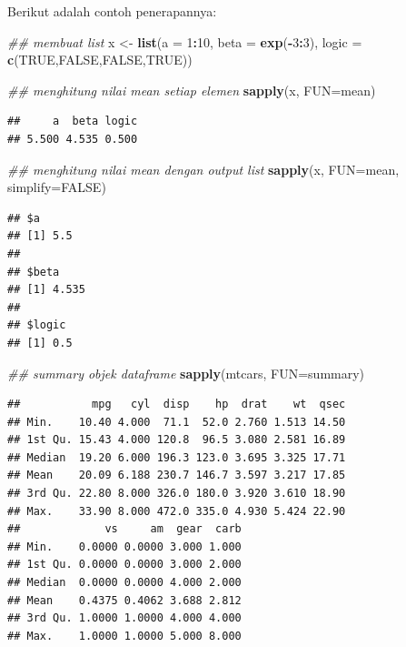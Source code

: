\documentclass[]{book}
\newenvironment{Shaded}{\begin{snugshade}}{\end{snugshade}}
\newcommand{\CommentTok}[1]{\textcolor[rgb]{0.56,0.35,0.01}{\textit{#1}}}
\newcommand{\DataTypeTok}[1]{\textcolor[rgb]{0.13,0.29,0.53}{#1}}
\newcommand{\DecValTok}[1]{\textcolor[rgb]{0.00,0.00,0.81}{#1}}
\newcommand{\KeywordTok}[1]{\textcolor[rgb]{0.13,0.29,0.53}{\textbf{#1}}}
\newcommand{\NormalTok}[1]{#1}
\newcommand{\OperatorTok}[1]{\textcolor[rgb]{0.81,0.36,0.00}{\textbf{#1}}}
\newcommand{\OtherTok}[1]{\textcolor[rgb]{0.56,0.35,0.01}{#1}}
\newcommand{\StringTok}[1]{\textcolor[rgb]{0.31,0.60,0.02}{#1}}
\theoremstyle{definition}
\theoremstyle{definition}
\theoremstyle{definition}
\theoremstyle{remark}
\begin{document}
Berikut adalah contoh penerapannya:

\begin{Shaded}
\begin{Highlighting}[]
\CommentTok{## membuat list}
\NormalTok{x <-}\StringTok{ }\KeywordTok{list}\NormalTok{(}\DataTypeTok{a =} \DecValTok{1}\OperatorTok{:}\DecValTok{10}\NormalTok{, }\DataTypeTok{beta =} \KeywordTok{exp}\NormalTok{(}\OperatorTok{-}\DecValTok{3}\OperatorTok{:}\DecValTok{3}\NormalTok{), }\DataTypeTok{logic =} \KeywordTok{c}\NormalTok{(}\OtherTok{TRUE}\NormalTok{,}\OtherTok{FALSE}\NormalTok{,}\OtherTok{FALSE}\NormalTok{,}\OtherTok{TRUE}\NormalTok{))}

\CommentTok{## menghitung nilai mean setiap elemen}
\KeywordTok{sapply}\NormalTok{(x, }\DataTypeTok{FUN=}\NormalTok{mean)}
\end{Highlighting}
\end{Shaded}

\begin{verbatim}
##     a  beta logic 
## 5.500 4.535 0.500
\end{verbatim}

\begin{Shaded}
\begin{Highlighting}[]
\CommentTok{## menghitung nilai mean dengan output list}
\KeywordTok{sapply}\NormalTok{(x, }\DataTypeTok{FUN=}\NormalTok{mean, }\DataTypeTok{simplify=}\OtherTok{FALSE}\NormalTok{)}
\end{Highlighting}
\end{Shaded}

\begin{verbatim}
## $a
## [1] 5.5
## 
## $beta
## [1] 4.535
## 
## $logic
## [1] 0.5
\end{verbatim}

\begin{Shaded}
\begin{Highlighting}[]
\CommentTok{## summary objek dataframe}
\KeywordTok{sapply}\NormalTok{(mtcars, }\DataTypeTok{FUN=}\NormalTok{summary)}
\end{Highlighting}
\end{Shaded}

\begin{verbatim}
##           mpg   cyl  disp    hp  drat    wt  qsec
## Min.    10.40 4.000  71.1  52.0 2.760 1.513 14.50
## 1st Qu. 15.43 4.000 120.8  96.5 3.080 2.581 16.89
## Median  19.20 6.000 196.3 123.0 3.695 3.325 17.71
## Mean    20.09 6.188 230.7 146.7 3.597 3.217 17.85
## 3rd Qu. 22.80 8.000 326.0 180.0 3.920 3.610 18.90
## Max.    33.90 8.000 472.0 335.0 4.930 5.424 22.90
##             vs     am  gear  carb
## Min.    0.0000 0.0000 3.000 1.000
## 1st Qu. 0.0000 0.0000 3.000 2.000
## Median  0.0000 0.0000 4.000 2.000
## Mean    0.4375 0.4062 3.688 2.812
## 3rd Qu. 1.0000 1.0000 4.000 4.000
## Max.    1.0000 1.0000 5.000 8.000
\end{verbatim}
\end{document}
